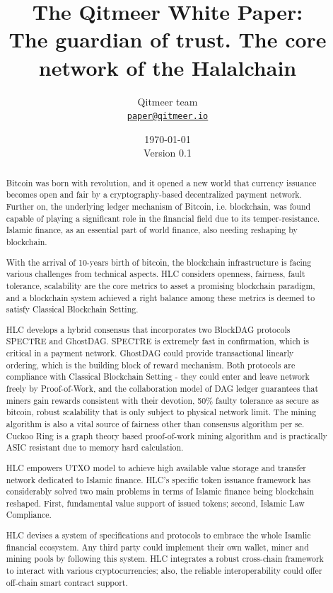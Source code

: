 \documentclass[a4paper,11pt]{article}
\title{\LARGE The Qitmeer White Paper:\\
	\Large The guardian of trust. The core network of the Halalchain}
\author{
	Qitmeer team\\
		\small\href{mailto:paper@qitmeer.io}
			{\nolinkurl{paper@qitmeer.io}}
	}
\date{\today\\\small Version 0.1}
\newcommand{\watermark}[3]{\AddToShipoutPictureBG{
	\parbox[b][\paperheight]{\paperwidth}{
		\vfill%
		\centering%
	\tikz[remember picture, overlay]%
	  \node [rotate = #1, scale = #2] at (current page.center)%
	      {\textcolor{gray!80!cyan!30}{#3}};
	  \vfill}}}
\begin{document}
\clearpage
\pagestyle{plain}

\maketitle


\begin{abstract}

	Bitcoin was born with revolution, and it opened a new world that currency issuance becomes open and fair by a cryptography-based decentralized payment network. Further on, the underlying ledger mechanism of Bitcoin, i.e. blockchain, was found capable of playing a significant role in the financial field due to its temper-resistance. Islamic finance, as an essential part of world finance, also needing reshaping by blockchain. 

	With the arrival of 10-years birth of bitcoin, the blockchain infrastructure is 	facing various challenges from technical aspects. HLC considers openness, 	fairness, fault tolerance, scalability are the core metrics to asset a promising 	blockchain paradigm, and a blockchain system achieved a right balance among these metrics is deemed to satisfy Classical Blockchain Setting. 

	HLC develops a hybrid consensus that incorporates two BlockDAG protocols SPECTRE and GhostDAG. SPECTRE is extremely fast in confirmation, which is critical in a payment network. GhostDAG could provide transactional linearly ordering, which is the building block of reward mechanism. Both protocols are compliance with Classical Blockchain Setting - they could enter and leave network freely by Proof-of-Work, and the collaboration model of DAG ledger guarantees that miners gain rewards consistent with their devotion, 50\% faulty tolerance as secure as bitcoin, robust scalability that is only subject to physical network limit. The mining algorithm is also a vital source of fairness other than consensus algorithm per se. Cuckoo Ring is a graph theory based proof-of-work mining algorithm and is practically ASIC resistant due to memory hard calculation.
	
	HLC empowers UTXO model to achieve high available value storage and transfer network dedicated to Islamic finance. HLC's specific token issuance framework has considerably solved two main problems in terms of  Islamic finance being blockchain reshaped.  First, fundamental value support of issued tokens; second, Islamic Law Compliance.
	
	HLC devises a system of specifications and protocols to embrace the whole Isamlic financial ecosystem. Any third party could implement their own wallet, miner and mining pools by following this system. HLC integrates a robust cross-chain framework to interact with various cryptocurrencies; also, the reliable interoperability could offer off-chain smart contract support.

\end{abstract}
\end{document}

